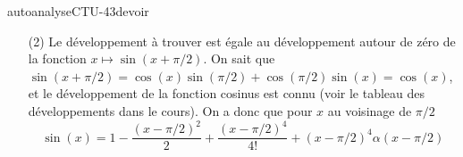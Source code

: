 
\begin{corrige}{autoanalyseCTU-43devoir}

  \begin{enumerate}
 
  \item[(2)] Le développement à trouver est égale au développement autour de zéro de la fonction $x\mapsto \sin(x+\pi/2)$. On sait que $\sin(x+\pi/2) = \cos(x)\sin(\pi/2) +\cos(\pi/2)\sin(x) = \cos(x)$, et le développement de la fonction cosinus est connu (voir le tableau des développements dans le cours). On a donc que pour $x$ au voisinage de $\pi/2$  
\[
\sin(x) = 1 - \frac{(x-\pi/2)^2}{2} +\frac{(x-\pi/2)^4}{4!} +(x-\pi/2)^4\alpha(x-\pi/2) 
\]
 \end{enumerate}
\end{corrige}   
